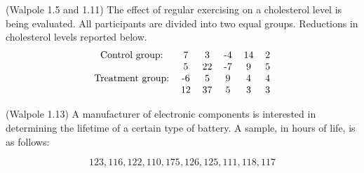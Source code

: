 \documentclass[14pt]{exam}
\begin{document}
\begin{questions}
		
		\question
		\label{ex:1_5}
		(Walpole 1.5 and 1.11)
		The effect of regular exercising on a cholesterol level is being evaluated. All participants are  divided into two equal groups. Reductions in cholesterol levels reported below.
		$$
		\begin{tabular}{cccccc}
			Control group: & 7 & 3 & -4 & 14 & 2\\
						   & 5 & 22 & -7 & 9 & 5\\
			Treatment group: & -6 & 5 & 9 & 4 & 4\\
							 & 12 & 37 & 5 & 3 & 3
		\end{tabular}
		\label{tab:1_5}
		$$
		
		\question
		(Walpole 1.13)
		A manufacturer of electronic components is interested in determining the lifetime of a certain type of battery. A sample, in hours of life, is as follows:
		
		$$
		123, 116, 122, 110, 175, 126, 125, 111, 118, 117
		$$
		

\end{questions}
\end{document}
